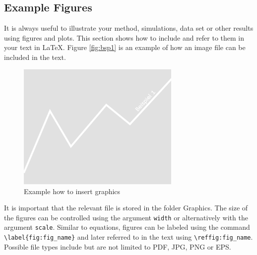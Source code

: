 \documentclass[12pt]{article}
\begin{document}
\subsection{Example Figures}
It is always useful to illustrate your method, simulations, data set or other results using figures and plots. This section shows how to include and refer to them in your text in \LaTeX.
Figure \vref{fig:bsp1} is an example of how an image file can be included in the text. 
\begin{figure}[h!]
	\centering
	\includegraphics[width=0.7\textwidth]{./Graphics/bsp1.png}
	\caption{Example how to insert graphics}
	\label{fig:bsp1}
\end{figure}
It is important that the relevant file is stored in the folder Graphics. The size of the figures can be controlled using the argument \texttt{width} or alternatively with the argument \texttt{scale}. 
Similar to equations, figures can be labeled using the command \texttt{\textbackslash label\{fig:fig\_name\}} and later referred to in the text using \texttt{\textbackslash ref{fig:fig\_name}}. Possible file types include but are not limited to PDF, JPG, PNG or EPS.
\end{document}
